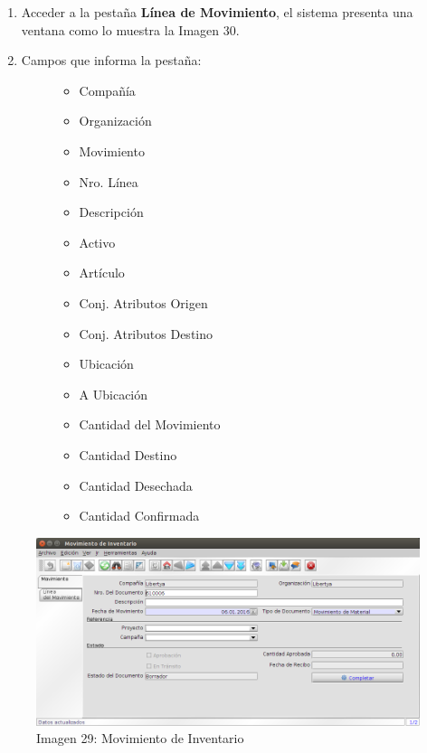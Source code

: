 \documentclass[letterpaper,10pt,spanish]{sphinxmanual}
\begin{document}
\begin{enumerate}
\item {} 
Acceder a la pestaña \textbf{Línea de Movimiento}, el sistema presenta una ventana como lo muestra la Imagen 30.

\item {} \begin{description}
\item[{Campos que informa la pestaña:}] \leavevmode\begin{itemize}
\item {} 
Compañía

\item {} 
Organización

\item {} 
Movimiento

\item {} 
Nro. Línea

\item {} 
Descripción

\item {} 
Activo

\item {} 
Artículo

\item {} 
Conj. Atributos Origen

\item {} 
Conj. Atributos Destino

\item {} 
Ubicación

\item {} 
A Ubicación

\item {} 
Cantidad del Movimiento

\item {} 
Cantidad Destino

\item {} 
Cantidad Desechada

\item {} 
Cantidad Confirmada

\end{itemize}

\end{description}

\end{enumerate}
\begin{figure}[htbp]
\centering
\capstart

\includegraphics{ly_mov_1.png}
\caption{Imagen 29: Movimiento de Inventario}\end{figure}
\end{document}
